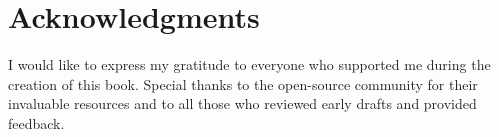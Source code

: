 \chapter{Acknowledgments}
I would like to express my gratitude to everyone who supported me during the creation of this book. Special thanks to the open-source community for their invaluable resources and to all those who reviewed early drafts and provided feedback.